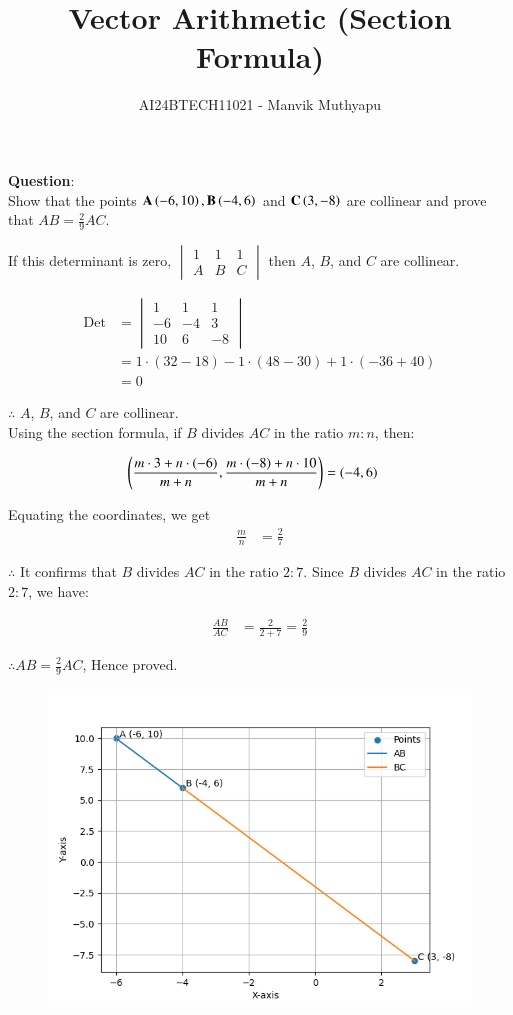 \documentclass[journal,12pt,onecolumn]{IEEEtran}
\title{Vector Arithmetic (Section Formula)}
\author{AI24BTECH11021 - Manvik Muthyapu}
\theoremstyle{remark}
\begin{document}


\maketitle
\bigskip

\renewcommand{\thefigure}{\theenumi}
\renewcommand{\thetable}{\theenumi}


\textbf{Question}:\\

Show that the points $\textbf{A}\left(-6,10\right),\textbf{B}\left(-4,6\right)$ and $\textbf{C}\left(3,-8\right)$ are collinear and prove that $AB = \frac{2}{9}AC$.\\
		
\solution 

If this determinant is zero, 
$
\begin{vmatrix}
1 & 1 & 1 \\
A & B & C
\end{vmatrix}
$
then $A$, $B$, and $C$ are collinear.

\begin{align}
\text{Det} &=
\begin{vmatrix}
1 & 1 & 1 \\
-6 & -4 & 3 \\
10 & 6 & -8
\end{vmatrix} \\
&= 1 \cdot (32 - 18) - 1 \cdot (48 - 30) + 1 \cdot (-36 + 40) \\
&= 0
\end{align}

$\therefore$ $A$, $B$, and $C$ are collinear.\\

Using the section formula, if $B$ divides $AC$ in the ratio $m:n$, then:

\begin{align}
\left(\frac{m \cdot 3 + n \cdot (-6)}{m+n}, \frac{m \cdot (-8) + n \cdot 10}{m+n}\right) &= (-4, 6) 
\end{align}

Equating the coordinates, we get
\begin{align}
\frac{m}{n} &= \frac{2}{7}
\end{align}

$\therefore$ It confirms that $B$ divides $AC$ in the ratio $2:7$. Since $B$ divides $AC$ in the ratio $2:7$, we have:

\begin{align}
\frac{AB}{AC} &= \frac{2}{2+7} = \frac{2}{9}
\end{align}

$\therefore AB = \frac{2}{9} AC$, Hence proved.

\begin{figure}[h!]
	\centering
	\includegraphics[width=0.7\linewidth]{figs/fig1.png}
\end{figure}
\end{document}
